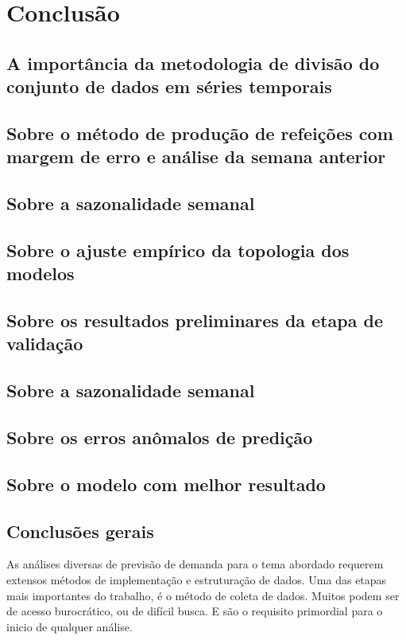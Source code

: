 \documentclass[	12pt, Times, openright, twoside, a4paper, english, brazil]{abntex2}
\begin{document}
  \chapter{Conclusão}
    \section{A importância da metodologia de divisão do conjunto de dados em séries temporais}
    \section{Sobre o método de produção de refeições com margem de erro e análise da semana anterior}
    \section{Sobre a sazonalidade semanal}
    \section{Sobre o ajuste empírico da topologia dos modelos}
    \section{Sobre os resultados preliminares da etapa de validação}
    \section{Sobre a sazonalidade semanal}
    \section{Sobre os erros anômalos de predição}
    \section{Sobre o modelo com melhor resultado}
    \section{Conclusões gerais}
         As análises diversas de previsão de demanda para o tema abordado requerem extensos métodos de implementação e estruturação de dados.
        Uma das etapas mais importantes do trabalho, é o método de coleta de dados. Muitos podem ser de acesso burocrático, ou de difícil busca. E são o requisito primordial para o inicio de qualquer análise.
        
\end{document}
